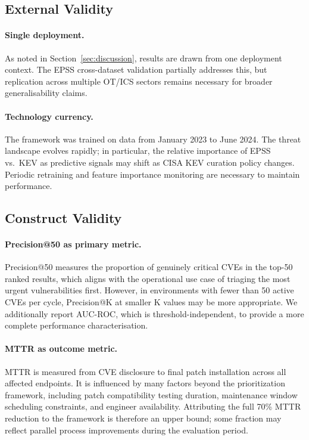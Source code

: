 \documentclass[review,12pt]{elsarticle}
\begin{document}
\subsection{External Validity}

\paragraph{Single deployment.} As noted in Section~\ref{sec:discussion}, results are drawn from one deployment context. The EPSS cross-dataset validation partially addresses this, but replication across multiple OT/ICS sectors remains necessary for broader generalisability claims.

\paragraph{Technology currency.} The framework was trained on data from January 2023 to June 2024. The threat landscape evolves rapidly; in particular, the relative importance of EPSS vs.\ KEV as predictive signals may shift as CISA KEV curation policy changes. Periodic retraining and feature importance monitoring are necessary to maintain performance.

\subsection{Construct Validity}

\paragraph{Precision@50 as primary metric.} Precision@50 measures the proportion of genuinely critical CVEs in the top-50 ranked results, which aligns with the operational use case of triaging the most urgent vulnerabilities first. However, in environments with fewer than 50 active CVEs per cycle, Precision@K at smaller K values may be more appropriate. We additionally report AUC-ROC, which is threshold-independent, to provide a more complete performance characterisation.

\paragraph{MTTR as outcome metric.} MTTR is measured from CVE disclosure to final patch installation across all affected endpoints. It is influenced by many factors beyond the prioritization framework, including patch compatibility testing duration, maintenance window scheduling constraints, and engineer availability. Attributing the full 70\% MTTR reduction to the framework is therefore an upper bound; some fraction may reflect parallel process improvements during the evaluation period.
\end{document}
